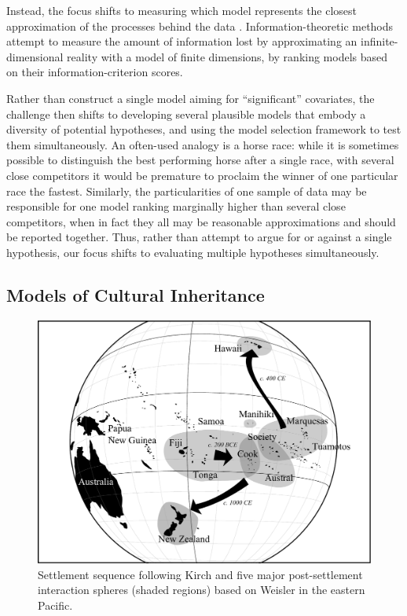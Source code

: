 Instead, the focus shifts to measuring which model represents the closest approximation of the processes behind the data \citep{Burnham&Anderson:2002}.  Information-theoretic methods attempt to measure the amount of information lost by approximating an infinite-dimensional reality with a model of finite dimensions, by ranking models based on their information-criterion scores.

Rather than construct a single model aiming for ``significant'' covariates, the challenge then shifts to developing several plausible models that embody a diversity of potential hypotheses, and using the model selection framework to test them simultaneously.  An often-used analogy is a horse race: while it is sometimes possible to distinguish the best performing horse after a single race, with several close competitors it would be premature to proclaim the winner of one particular race the fastest.  Similarly, the particularities of one sample of data may be responsible for one model ranking marginally higher than several close competitors, when in fact they all may be reasonable approximations and should be reported together.  Thus, rather than attempt to argue for or against a single hypothesis, our focus shifts to evaluating multiple hypotheses simultaneously.

\subsection{Models of Cultural Inheritance}
    
    \begin{figure}[t]
    \begin{center}
      \includegraphics[scale=0.4]{figures/canoes/figMap.pdf}
    \end{center}
    \caption{\small Settlement sequence following Kirch \citeyearpar[black arrows]{Kirch2000:Road} and five major post-settlement interaction spheres (shaded regions) based on Weisler \citeyearpar{Weisler1998} in the eastern Pacific.}
    \label{map}
    \end{figure}
    
